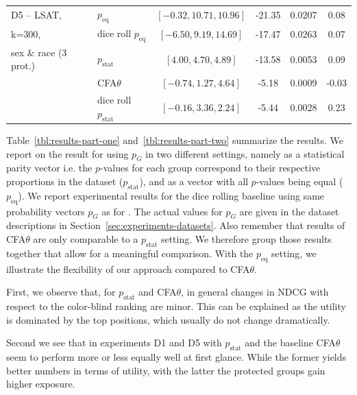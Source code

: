 \begin{table}[t!]
{\begin{tabular}{llcccc}
		\midrule
		\midrule
		D5 -- LSAT, 			& \algoFAIR $p_{\text{eq}}$ 	& $[-0.32, 10.71, 10.96]$ 	& -21.35 	& 0.0207 	& 0.08 \\
		k=300, 					& dice roll $p_{\text{eq}}$		& $[-6.50, 9.19, 14.69]$	& -17.47	& 0.0263 	& 0.07\\
								\cline{2-6}
		sex \& race (3 prot.)	& \algoFAIR $p_{\text{stat}}$ 	& $[4.00, 4.70, 4.89]$ 		& -13.58 	& 0.0053	& 0.09 \\
							 	& CFA$\theta$ 					& $[-0.74, 1.27, 4.64]$ 	& -5.18		& 0.0009 	& -0.03 \\
								& dice roll $p_{\text{stat}}$	& $[-0.16, 3.36, 2.24]$		& -5.44		& 0.0028 	& 0.23 \\

		\bottomrule
	\end{tabular}
	}
\end{table}
%
Table~\ref{tbl:results-part-one} and~\ref{tbl:results-part-two} summarize the results. 
%
We report on the result for \algoFAIR using $p_G$ in two different settings, namely as a statistical parity vector i.e. the $p$-values for each group correspond to their respective proportions in the dataset ($p_{\text{stat}}$), and as a vector with all $p$-values being equal ($p_{\text{eq}}$).
%
We report experimental results for the dice rolling baseline using same probability vectors $p_G$ as for \algoFAIR.
%
The actual values for $p_G$ are given in the dataset descriptions in Section~\ref{sec:experiments-datasets}.
%
Also remember that results of CFA$\theta$ are only comparable to a \algoFAIR $p_{\text{stat}}$ setting.
%
We therefore group those results together that allow for a meaningful comparison.
%
With the $p_{\text{eq}}$ setting, we illustrate the flexibility of our approach compared to CFA$\theta$.

First, we observe that, for \algoFAIR $p_{\text{stat}}$ and CFA$\theta$, in general changes in NDCG with respect to the color-blind ranking are minor.
%
This can be explained as the utility is dominated by the top positions, which usually do not change dramatically.

Second we see that in experiments D1 and D5 \algoFAIR with $p_{\text{stat}}$ and the baseline CFA$\theta$ seem to perform more or less equally well at first glance.
%
While the former yields better numbers in terms of utility, with the latter the protected groups gain higher exposure.

